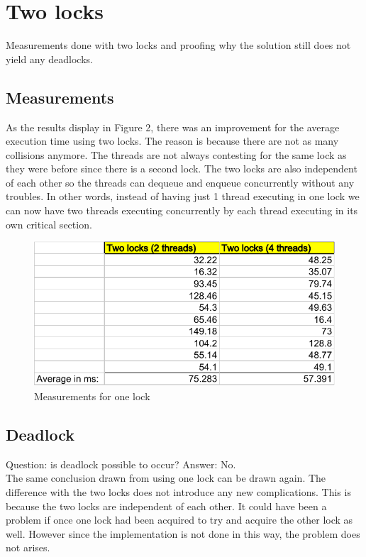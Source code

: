 \documentclass[a4paper,11pt,twoside,fleqn]{article}
\begin{document}
\section{Two locks}
Measurements done with two locks and proofing why the solution still does not yield any deadlocks.

\subsection{Measurements}

As the results display in Figure 2, there was an improvement for the average execution time using two locks. The reason is because there are not as many collisions anymore. The threads are not always contesting for the same lock as they were before since there is a second lock. The two locks are also independent of each other so the threads can dequeue and enqueue concurrently without any troubles. In other words, instead of having just 1 thread executing in one lock we can now have two threads executing concurrently by each thread executing in its own critical section.

\begin{figure}[h]
	\caption{Measurements for one lock}
	\centering
		\includegraphics{measurements-for-two-locks}
\end{figure}

\subsection{Deadlock}

Question: is deadlock possible to occur? Answer: No.
\\
The same conclusion drawn from using one lock can be drawn again. The difference with the two locks does not introduce any new complications. This is because the two locks are independent of each other. It could have been a problem if once one lock had been acquired to try and acquire the other lock as well. However since the implementation is not done in this way, the problem does not arises.

\end{document}
